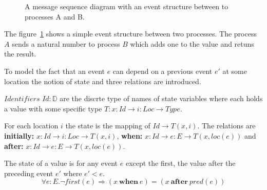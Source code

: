 \begin{figure}
  \center
  \label{fig:sequence}
  \caption{A message sequence diagram with an event structure between to
    processes A and B.}
\end{figure}

The figure~\ref{fig:sequence} shows a simple event structure between two
processes. The process $A$ sends a natural number to process $B$ which adds
one to the value and retuns the result.

To model the fact that an event $e$ can depend on a previous event $e'$ at
some location the notion of state and three relations are introduced.~\cite{bickford2005causal}

\begin{defi}
  $Identifiers$ $Id:\mathbb{D}$ are the discrte type of names of state variables where each
  holds a value with some specific type $T:x:Id\rightarrow i:Loc\rightarrow Type$.
\end{defi}

\begin{defi}
  For each location $i$ the state is the mapping of $Id\rightarrow T(x,i)$.
  The relations are \textbf{initially:} $x:Id\rightarrow i:Loc\rightarrow T(x,i)$,
  \textbf{when:} $x:Id\rightarrow e:E\rightarrow T(x,loc(e))$ and \textbf{after:} $x:Id\rightarrow e:E\rightarrow T(x,loc(e))$.
\end{defi}

\begin{axiom}
  The state of a value is for any event $e$ except the first, the value after
  the preceding event $e'$ where $e'<e$.
  \[\forall e:E.\neg first(e)\Rightarrow (x\ \textbf{when}\ e) = (x\ \textbf{after}\ pred(e))\]
\end{axiom}

